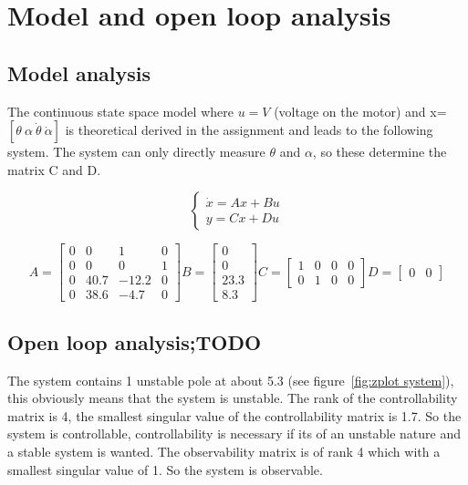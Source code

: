 \section{Model and open loop analysis}
\subsection{Model analysis}
The continuous state space model where $u=V$ (voltage on the motor) and x=$[\theta \ \alpha \  \dot{\theta} \ \dot{\alpha} ]$ is theoretical derived in the assignment and leads to the following system. The system can only directly measure $\theta$ and $\alpha$, so these determine the matrix C and D.

$$
\begin{cases}
\dot{x}=Ax+Bu \\
y=Cx+Du
\end{cases}
$$

$$
A=
\begin{bmatrix}
0 & 0 & 1 & 0 \\
0 & 0 & 0 & 1 \\
0 & 40.7 & -12.2 & 0 \\
0 & 38.6 & -4.7 & 0 
\end{bmatrix}
B=
\begin{bmatrix}
0 \\
0 \\
23.3 \\
8.3
\end{bmatrix}
C=
\begin{bmatrix}
1 & 0 & 0 & 0\\
0 & 1 & 0 & 0
\end{bmatrix}
D=
\begin{bmatrix}
0 & 0
\end{bmatrix}
$$

\subsection{Open loop analysis;TODO}

The system contains 1 unstable pole at about 5.3 (see figure~\ref{fig:zplot system}), this obviously means that the system is unstable. The rank of the controllability matrix is 4, the smallest singular value of the controllability matrix is 1.7. So the system is controllable, controllability is necessary if its of an unstable nature and a stable system is wanted. The observability matrix is of rank 4 which with a smallest singular value of 1. So the system is observable.

